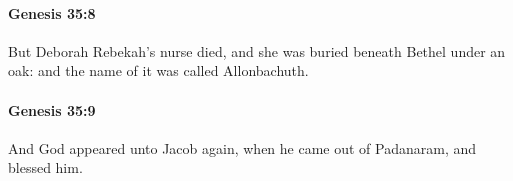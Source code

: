 		\paragraph{Genesis 35:8} %
			\label{GENESIS-35-8}

			But Deborah Rebekah's nurse died, and she was buried beneath Bethel under an oak: and the name of it was called Allonbachuth.


		\paragraph{Genesis 35:9} %
			\label{GENESIS-35-9}

			And God appeared unto Jacob again, when he came out of Padanaram, and blessed him.


